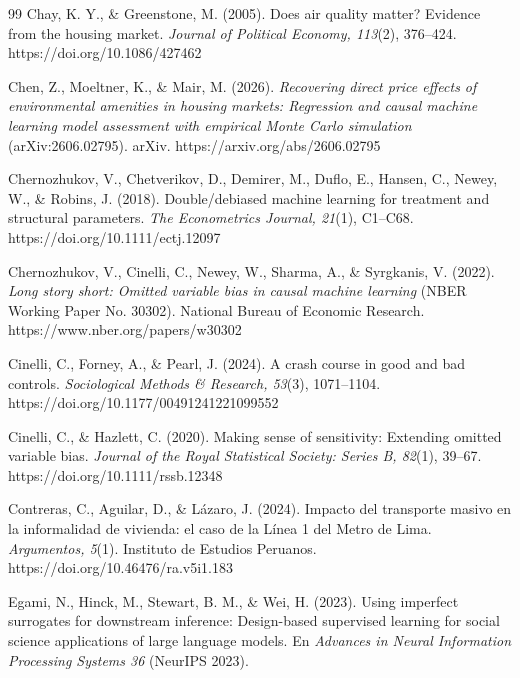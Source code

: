 \begin{thebibliography}{99}
Chay, K. Y., \& Greenstone, M. (2005). Does air quality matter? Evidence from the housing market. \textit{Journal of Political Economy, 113}(2), 376--424. https://doi.org/10.1086/427462

Chen, Z., Moeltner, K., \& Mair, M. (2026). \textit{Recovering direct price effects of environmental amenities in housing markets: Regression and causal machine learning model assessment with empirical Monte Carlo simulation} (arXiv:2606.02795). arXiv. https://arxiv.org/abs/2606.02795

Chernozhukov, V., Chetverikov, D., Demirer, M., Duflo, E., Hansen, C., Newey, W., \& Robins, J. (2018). Double/debiased machine learning for treatment and structural parameters. \textit{The Econometrics Journal, 21}(1), C1--C68. https://doi.org/10.1111/ectj.12097

Chernozhukov, V., Cinelli, C., Newey, W., Sharma, A., \& Syrgkanis, V. (2022). \textit{Long story short: Omitted variable bias in causal machine learning} (NBER Working Paper No. 30302). National Bureau of Economic Research. https://www.nber.org/papers/w30302

Cinelli, C., Forney, A., \& Pearl, J. (2024). A crash course in good and bad controls. \textit{Sociological Methods \& Research, 53}(3), 1071--1104. https://doi.org/10.1177/00491241221099552

Cinelli, C., \& Hazlett, C. (2020). Making sense of sensitivity: Extending omitted variable bias. \textit{Journal of the Royal Statistical Society: Series B, 82}(1), 39--67. https://doi.org/10.1111/rssb.12348

Contreras, C., Aguilar, D., \& Lázaro, J. (2024). Impacto del transporte masivo en la informalidad de vivienda: el caso de la Línea 1 del Metro de Lima. \textit{Argumentos, 5}(1). Instituto de Estudios Peruanos. https://doi.org/10.46476/ra.v5i1.183

Egami, N., Hinck, M., Stewart, B. M., \& Wei, H. (2023). Using imperfect surrogates for downstream inference: Design-based supervised learning for social science applications of large language models. En \textit{Advances in Neural Information Processing Systems 36} (NeurIPS 2023).


\end{thebibliography}
